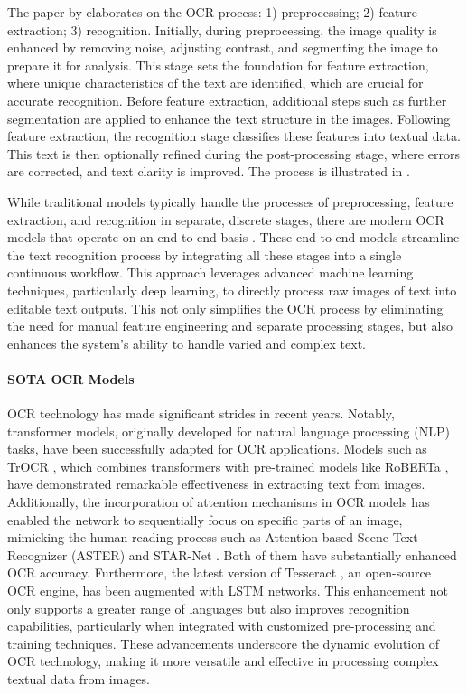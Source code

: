 The paper by \cite{karthick2019steps} elaborates on the OCR process: 1) preprocessing; 2) feature extraction; 3) recognition. Initially, during preprocessing, the image quality is enhanced by removing noise, adjusting contrast, and segmenting the image to prepare it for analysis. This stage sets the foundation for feature extraction, where unique characteristics of the text are identified, which are crucial for accurate recognition. Before feature extraction, additional steps such as further segmentation are applied to enhance the text structure in the images. Following feature extraction, the recognition stage classifies these features into textual data. This text is then optionally refined during the post-processing stage, where errors are corrected, and text clarity is improved. The process is illustrated in .


While traditional models typically handle the processes of preprocessing, feature extraction, and recognition in separate, discrete stages, there are modern OCR models that operate on an end-to-end basis \citep{huang2021multiplexed}\citep{neudecker2019ocr}\citep{belay2020amharic}. These end-to-end models streamline the text recognition process by integrating all these stages into a single continuous workflow. This approach leverages advanced machine learning techniques, particularly deep learning, to directly process raw images of text into editable text outputs. This not only simplifies the OCR process by eliminating the need for manual feature engineering and separate processing stages, but also enhances the system's ability to handle varied and complex text.

\paragraph*{SOTA OCR Models}
OCR technology has made significant strides in recent years. Notably, transformer models, originally developed for natural language processing (NLP) tasks, have been successfully adapted for OCR applications. Models such as TrOCR \citep{li2023trocr}, which combines transformers \citep{vaswani2017attention} with pre-trained models like RoBERTa \citep{liu2019roberta}, have demonstrated remarkable effectiveness in extracting text from images. Additionally, the incorporation of attention mechanisms in OCR models has enabled the network to sequentially focus on specific parts of an image, mimicking the human reading process such as Attention-based Scene Text Recognizer (ASTER) \citep{shi2018aster} and STAR-Net \citep{liu2016star}. Both of them have substantially enhanced OCR accuracy. Furthermore, the latest version of Tesseract \citep{smith2007overview}, an open-source OCR engine, has been augmented with LSTM \citep{hochreiter1997long} networks. This enhancement not only supports a greater range of languages but also improves recognition capabilities, particularly when integrated with customized pre-processing and training techniques. These advancements underscore the dynamic evolution of OCR technology, making it more versatile and effective in processing complex textual data from images.

